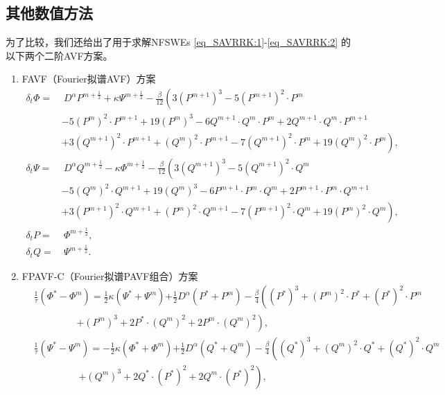 \subsection{其他数值方法}
为了比较，我们还给出了用于求解NFSWEs \eqref{eq_SAVRRK:1}-\eqref{eq_SAVRRK:2} 的以下两个二阶AVF方案。
\begin{enumerate}[$\bullet$]
\item FAVF（Fourier拟谱AVF）方案
\begin{align}
\delta_{t} \varPhi =&~{D^{\alpha} P^{m+\frac{1}{2}}}+\kappa \Psi^{m+\frac{1}{2}}-\frac{\beta}{12}\left(3 (P^{m+1})^3-5 (P^{m+1})^2\cdot P^{m}\right.\nonumber\\
		&-5 (P^{m})^2\cdot P^{m+1}+19 (P^{m})^3-6 Q^{m+1}\cdot Q^{m}\cdot P^{m}+2 Q^{m+1}\cdot Q^{m}\cdot P^{m+1} \nonumber\\
		&+\left. 3 (Q^{m+1})^2\cdot P^{m+1}+(Q^{m})^2\cdot P^{m+1}-7 (Q^{m+1})^2\cdot P^{m}+19 (Q^{m} )^2\cdot P^{m}\right),\label{eq_PAVF:66}\\
\delta_{t} \Psi =&~{D^{\alpha} Q^{m+\frac{1}{2}}}-\kappa \varPhi^{m+\frac{1}{2}}-\frac{\beta}{12}\left(3 (Q^{m+1})^3-5 (Q^{m+1})^2\cdot Q^{m}\right.\nonumber\\
		&-5 (Q^{m})^2\cdot Q^{m+1}+19 (Q^{m})^3-6 P^{m+1}\cdot P^{m}\cdot Q^{m}+2 P^{m+1}\cdot P^{m}\cdot Q^{m+1} \nonumber\\
		&+\left. 3 (P^{m+1})^2\cdot Q^{m+1}+(P^{m})^2\cdot Q^{m+1}-7 (P^{m+1})^2\cdot Q^{m}+19 (P^{m} )^2\cdot Q^{m}\right),\label{eq_PAVF:67}\\
\delta_{t} P=&~\varPhi^{m+\frac{1}{2}},\label{eq_PAVF:68}\\
\delta_{t} Q=&~\Psi^{m+\frac{1}{2}}.\label{eq_PAVF:69}
\end{align}
\item FPAVF-C（Fourier拟谱PAVF组合）方案
\begin{align}
&\frac{1}{\tau}\left(\varPhi^{*}-\varPhi^{m}\right)=\frac{1}{2}\kappa(\Psi^{*}+\Psi^{m}){+\frac{1}{2}D^{\alpha} (P^{*}+P^{m})}-\frac{\beta}{4}\left( (P^{*})^3+ (P^{m})^{2}\cdot P^{*}+(P^{*})^{2}\cdot P^{m}\right.\nonumber\\
		&~~~~~~~~~~~~~~~~~~~~\left.+ (P^{m})^{3}+2 P^{*}\cdot (Q^{m})^{2}+2 P^{m}\cdot (Q^{m})^{2}\right),\label{eq_PAVF:90}\\
&\frac{1}{\tau}\left(\Psi^{*}-\Psi^{m}\right)=-\frac{1}{2}\kappa (\varPhi^{*}+\varPhi^{m}){+\frac{1}{2}D^{\alpha} (Q^{*}+Q^{m})}-\frac{\beta}{4}\left( (Q^{*})^3+ (Q^{m})^{2}\cdot Q^{*}+ (Q^{*})^{2}\cdot Q^{m}\right.\nonumber\\
		&~~~~~~~~~~~~~~~~~~~~~\left.+ (Q^{m})^{3}+2 Q^{*}\cdot (P^{*})^{2}+2 Q^{m}\cdot (P^{*})^{2}\right),\label{eq_PAVF:91}\\

\end{align}
\end{enumerate}
